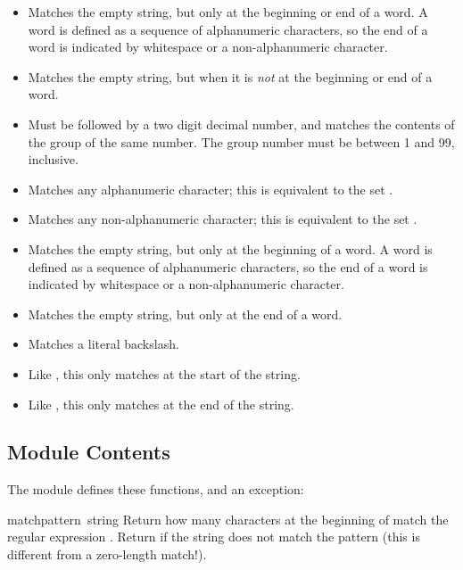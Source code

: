 \begin{itemize}
\item[\code{\e \e b}] Matches the empty string, but only at the
beginning or end of a word.  A word is defined as a sequence of
alphanumeric characters, so the end of a word is indicated by
whitespace or a non-alphanumeric character.
%
\item[\code{\e B}] Matches the empty string, but when it is \emph{not} at the
beginning or end of a word.
%
\item[\code{\e v}] Must be followed by a two digit decimal number, and
matches the contents of the group of the same number.  The group
number must be between 1 and 99, inclusive.
%
\item[\code{\e w}]Matches any alphanumeric character; this is
equivalent to the set \code{[a-zA-Z0-9]}.
%
\item[\code{\e W}] Matches any non-alphanumeric character; this is
equivalent to the set \code{[\^a-zA-Z0-9]}.
\item[\code{\e <}] Matches the empty string, but only at the beginning of a
word.  A word is defined as a sequence of alphanumeric characters, so
the end of a word is indicated by whitespace or a non-alphanumeric 
character.
\item[\code{\e >}] Matches the empty string, but only at the end of a
word.

\item[\code{\e \e \e \e}] Matches a literal backslash.

\item[\code{\e `}] Like \code{\^}, this only matches at the start of the
string.
\item[\code{\e \e '}] Like \code{\$}, this only matches at the end of
the string.
\end{itemize}

\subsection{Module Contents}

The module defines these functions, and an exception:


\begin{funcdesc}{match}{pattern\, string}
  Return how many characters at the beginning of  match
  the regular expression .  Return  if the
  string does not match the pattern (this is different from a
  zero-length match!).
\end{funcdesc}

